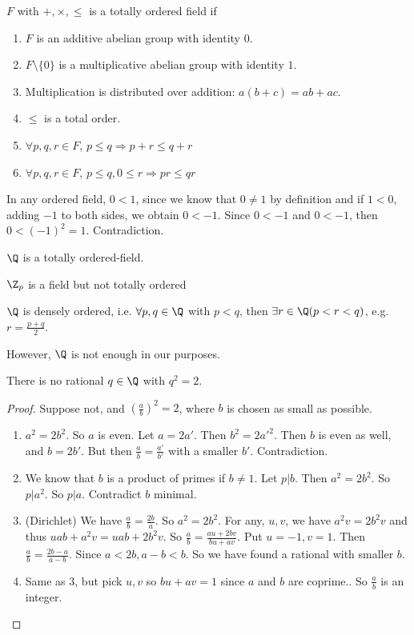 \documentclass[a4paper]{article}
\begin{document}
  \begin{defi}
    $F$ with $+, \times, \leq$ is a totally ordered field if
    \begin{enumerate}
      \item $F$ is an additive abelian group with identity $0$.
      \item $F\setminus \{0\}$ is a multiplicative abelian group with identity $1$.
      \item Multiplication is distributed over addition: $a(b + c) = ab + ac$.
      \item $\leq$ is a total order.
      \item $\forall p, q, r\in F$, $p \leq q\Rightarrow p + r \leq q+ r$
      \item $\forall p, q, r\in F$, $p \leq q, 0 \leq r\Rightarrow pr \leq qr$
    \end{enumerate}

    \note In any ordered field, $0 < 1$, since we know that $0 \not= 1$ by definition and if $1 < 0$, adding $-1$ to both sides, we obtain $0 < -1$. Since $0 < -1$ and $0 < -1$, then $0 < (-1)^2 = 1$. Contradiction.
  \end{defi}
  \begin{prop}
    $\Q$ is a totally ordered-field.
  \end{prop}

  \note $\Z_p$ is a field but not totally ordered

  \begin{prop}
    $\Q$ is densely ordered, i.e. $\forall p, q\in \Q$ with $p < q$, then $\exists r \in \Q( p < r < q)$, e.g. $r = \frac{p + q}{2}$.
  \end{prop}
  However, $\Q$ is not enough in our purposes. 
  \begin{prop}
    There is no rational $q\in \Q$ with $q^2 = 2$. 
  \end{prop}

  \begin{proof}
    Suppose not, and $(\frac{a}{b})^2 = 2$, where $b$ is chosen as small as possible.

    \begin{enumerate}
      \item $a^2 = 2b^2$. So $a$ is even. Let $a = 2a'$. Then $b^2 = 2a'^2$. Then $b$ is even as well, and $b = 2b'$. But then $\frac{a}{b} = \frac{a'}{b'}$ with a smaller $b'$. Contradiction.
      \item We know that $b$ is a product of primes if $b \not= 1$. Let $p | b$. Then $a^2 = 2b^2$. So $p | a^2$. So $p | a$. Contradict $b$ minimal.
      \item (Dirichlet) We have $\frac{a}{b} = \frac{2b}{a}$. So $a^2 = 2b^2$. For any, $u, v$, we have $a^2v = 2b^2v$ and thus $uab + a^2v = uab + 2b^2v$. So $\frac{a}{b} = \frac{au + 2bv}{bu + av}$. Put $u = -1, v = 1$. Then $\frac{a}{b} = \frac{2b - a}{a - b}$. Since $a < 2b, a - b < b$. So we have found a rational with smaller $b$.
      \item Same as 3, but pick $u, v$ so $bu + av = 1$ since $a$ and $b$ are coprime.. So $\frac{a}{b}$ is an integer. 
    \end{enumerate}
  \end{proof}
\end{document}
